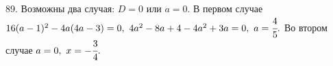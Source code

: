 89. Возможны два случая: $D=0$ или $a=0.$ В первом случае $16(a-1)^2-4a(4a-3)=0,\ 4a^2-8a+4-4a^2+3a=0,\ a=\cfrac{4}{5}.$ Во втором случае $a=0,\ x=-\cfrac{3}{4}.$\newpage\noindent

